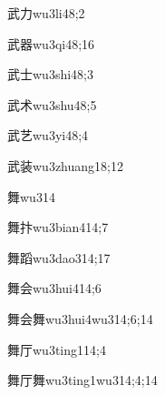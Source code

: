 \begin{verbete}{武力}{wu3li4}{8;2}
\end{verbete}

\begin{verbete}{武器}{wu3qi4}{8;16}
\end{verbete}

\begin{verbete}{武士}{wu3shi4}{8;3}
\end{verbete}

\begin{verbete}{武术}{wu3shu4}{8;5}
\end{verbete}

\begin{verbete}{武艺}{wu3yi4}{8;4}
\end{verbete}

\begin{verbete}{武装}{wu3zhuang1}{8;12}
\end{verbete}

\begin{verbete}{舞}{wu3}{14}
\end{verbete}

\begin{verbete}{舞抃}{wu3bian4}{14;7}
\end{verbete}

\begin{verbete}{舞蹈}{wu3dao3}{14;17}
\end{verbete}

\begin{verbete}{舞会}{wu3hui4}{14;6}
\end{verbete}

\begin{verbete}{舞会舞}{wu3hui4wu3}{14;6;14}
\end{verbete}

\begin{verbete}{舞厅}{wu3ting1}{14;4}
\end{verbete}

\begin{verbete}{舞厅舞}{wu3ting1wu3}{14;4;14}
\end{verbete}

